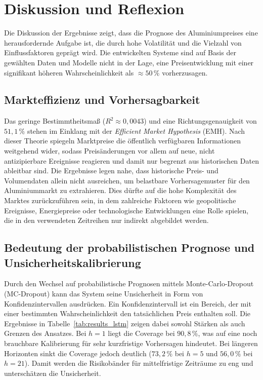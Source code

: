 \section{Diskussion und Reflexion}
\label{sec:diskussion}

Die Diskussion der Ergebnisse zeigt, dass die Prognose des Aluminiumpreises eine herausfordernde Aufgabe ist, die durch hohe Volatilität und die Vielzahl von Einflussfaktoren geprägt wird.
Die entwickelten Systeme sind auf Basis der gewählten Daten und Modelle nicht in der Lage, eine Preisentwicklung mit einer signifikant höheren Wahrscheinlichkeit als $\approx 50\,\%$ vorherzusagen.

\subsection{Markteffizienz und Vorhersagbarkeit}
Das geringe Bestimmtheitsmaß ($R^2 \approx 0{,}0043$) und eine Richtungsgenauigkeit von $51{,}1\,\%$ stehen im Einklang mit der \emph{Efficient Market Hypothesis} (EMH).
Nach dieser Theorie spiegeln Marktpreise die öffentlich verfügbaren Informationen weitgehend wider, sodass Preisänderungen vor allem auf neue, nicht antizipierbare Ereignisse reagieren und damit nur begrenzt aus historischen Daten ableitbar sind.
Die Ergebnisse legen nahe, dass historische Preis- und Volumendaten allein nicht ausreichen, um belastbare Vorhersagemuster für den Aluminiummarkt zu extrahieren.
Dies dürfte auf die hohe Komplexität des Marktes zurückzuführen sein, in dem zahlreiche Faktoren wie geopolitische Ereignisse, Energiepreise oder technologische Entwicklungen eine Rolle spielen, die in den verwendeten Zeitreihen nur indirekt abgebildet werden.

\subsection{Bedeutung der probabilistischen Prognose und Unsicherheitskalibrierung}
Durch den Wechsel auf probabilistische Prognosen mittels Monte-Carlo-Dropout (MC-Dropout) kann das System seine Unsicherheit in Form von Konfidenzintervallen ausdrücken. Ein Konfidenzintervall ist ein Bereich, der mit einer bestimmten Wahrscheinlichkeit den tatsächlichen Preis enthalten soll. Die Ergebnisse in Tabelle~\ref{tab:results_lstm} zeigen dabei sowohl Stärken als auch Grenzen des Ansatzes. Bei $h=1$ liegt die Coverage bei $90{,}8\,\%$, was auf eine noch brauchbare Kalibrierung für sehr kurzfristige Vorhersagen hindeutet. Bei längeren Horizonten sinkt die Coverage jedoch deutlich ($73{,}2\,\%$ bei $h=5$ und $56{,}0\,\%$ bei $h=21$). Damit werden die Risikobänder für mittelfristige Zeiträume zu eng und unterschätzen die Unsicherheit.

